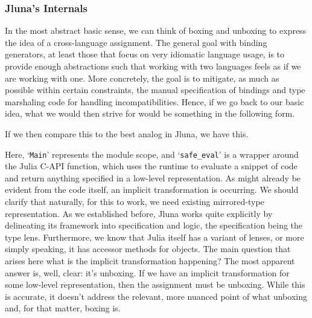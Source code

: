 \begin{listing}[ht!]
  
  \caption{Template metafunction function}
  \label{listing:template_meta_func}
\end{listing}

\subsubsection{Jluna's Internals}

In the most abstract basic sense, we can think of boxing and unboxing to express the idea of a cross-language assignment. The general goal with binding generators, at least those that focus on very idiomatic language usage, is to provide enough abstractions such that working with two languages feels as if we are working with one. More concretely, the goal is to mitigate, as much as possible within certain constraints, the manual specification of bindings and type marshaling code for handling incompatibilities. Hence, if we go back to our basic idea, what we would then strive for would be something in the following form.

\begin{listing}[ht!]
  
  \caption{Cross language assignment goal}
  \label{listing:assignment_goal}
\end{listing}

If we then compare this to the best analog in Jluna, we have this.

\begin{listing}[ht!]
  
  \caption{Jluna proxy assignment}
  \label{listing:jluna_proxy_assign}
\end{listing}

Here, `\texttt{Main}' represents the module scope, and `\texttt{safe\_eval}' is a wrapper around the Julia C-API function, which uses the runtime to evaluate a snippet of code and return anything specified in a low-level representation. As might already be evident from the code itself, an implicit transformation is occurring. We should clarify that naturally, for this to work, we need existing mirrored-type representation. As we established before, Jluna works quite explicitly by delineating its framework into specification and logic, the specification being the type lens. Furthermore, we know that Julia itself has a variant of lenses, or more simply speaking, it has accessor methods for objects. The main question that arises here what is the implicit transformation happening? The most apparent answer is, well, clear: it's unboxing. If we have an implicit transformation for some low-level representation, then the assignment must be unboxing. While this is accurate, it doesn't address the relevant, more nuanced point of what unboxing and, for that matter, boxing is. 

